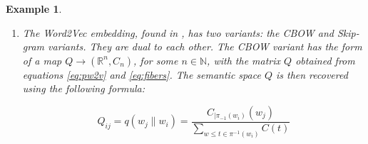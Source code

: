 \documentclass[10pt,a4paper]{elsarticle}
\renewcommand{\Bbb}{\mathbb}
\newcommand{\N}{\Bbb{N}}
\newcommand{\R}{\Bbb{R}}
\newtheorem{exa}[theorem]{Example}
\begin{document}
\begin{exa}
\begin{enumerate}
		Thus
		\begin{align}
			G_{ik}&=v_i^{T}\tilde{v_k}=\frac{\log(P_{ik})+\log(P_{ki})}{2} + \frac{1}{2}( a_{i}+ b_{k} + a_{k}+ b_{i})\\
			&=v_k^{T}\tilde{v_i}=\frac{\log(P_{ik})+\log(P_{ki})}{2} + \frac{1}{2}( a_{i}+ b_{k} + a_{k}+ b_{i})\\
			&=G_{ki} .
		\end{align}
	
		The matrix $G$ is known as the Gramm matrix. From this we can compute the matrix $(d_{GL})^{2}_{ik}=G_{ii}-2G_{ik}+G_{kk}$.  This yields the distance formula:
		
		\begin{equation}\label{eq:GloVedist}
			(d_{GV})_{ik}=\sqrt{\log\left(\frac{P_{ii}\cdot P_{kk}}{P_{ik}\cdot P_{ki}}\right)}=(d_{GV})_{ki}
		\end{equation}
		
		
		Given a configuration $(X,C_{X})$ with $D_{X}$ the divergence of on iteration of the GloVe embedding would be:
		
		\begin{equation}\label{eq:DivGL}
			D_{GV}(P\to(X,C_{X}))=\sum_{i, j}W_{ij}((d_{GL})_{ij}-(d_{X})_{ij})^{2}
		\end{equation}
		with $W_{ij}$ a weight attached to the co-occurrences. The final piece is to specify how the GloVe embedding computes the probabilities $P_{ij}$. Following \cite[Section 3]{pennington2014glove} we have
		
		\begin{equation}\label{eq:EndoGV}
			P_{ij}=p(w_{j}\| w_{i})=\frac{X_{ij}}{X_{i}}=\frac{C_{|\pi^{-1}(w_i)}(w_j)}{\sum_{k}C_{|\pi^{-1}(w_i)}(w_k)}
		\end{equation}		
		
		with$C_{|\pi^{-1}(w_i)}(w_j)$ tallies the co-occurrences of $w_j$ with respect to $w_i$ (which is why we compute the occurrences in the fibers $\pi^{-1}(w_i	)$.
		
		\item The Word2Vec embedding, found in \cite{Mikolov2013EfficientEO}, has two variants: the CBOW and Skip-gram variants. They are dual to each other. The CBOW variant has the form of a map $Q\to (\R^{n},C_{n})$, for some $n\in \N$, with the matrix $Q$ obtained from equations \eqref{eq:pw2v} and \eqref{eq:fibers}. The semantic space $Q$ is then recovered using the following formula:
		
		\begin{equation}\label{eq:EndoW2V}
			Q_{ij}=q(w_j\| w_i)=\frac{C_{|\pi_{-1}(w_i)}(w_j)}{\sum_{w\leq t\in\pi^{-1}(w_i)}C(t)}
		\end{equation}
		

\end{enumerate}
\end{exa}
\end{document}
